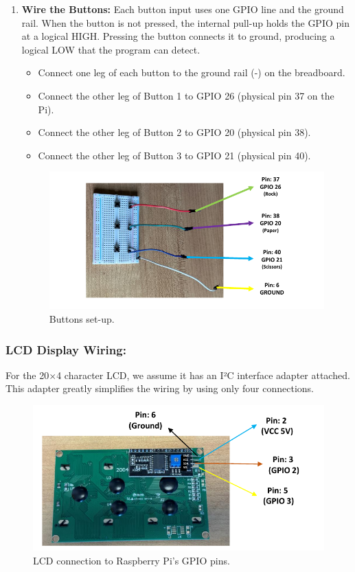 \documentclass[a4paper,11pt]{article}
\begin{document}
\begin{enumerate}
    \item \textbf{Wire the Buttons:} Each button input uses one GPIO line and the ground rail. 
    When the button is not pressed, the internal pull-up holds the GPIO pin at a logical HIGH. 
    Pressing the button connects it to ground, producing a logical LOW that the program can detect.
    \begin{itemize}
        \item Connect one leg of each button to the ground rail (-) on the breadboard.
        \item Connect the other leg of Button 1 to GPIO 26 (physical pin 37 on the Pi).
        \item Connect the other leg of Button 2 to GPIO 20 (physical pin 38).
        \item Connect the other leg of Button 3 to GPIO 21 (physical pin 40).
    \end{itemize}
    \begin{figure}[h] %
        \centering
        \includegraphics[width=1\textwidth]{fig1.pdf} %
        \caption{Buttons set-up.}
        \label{fig:runtime}
    \end{figure}

\end{enumerate}


\subsubsection*{LCD Display Wiring:}
For the 20$\times$4 character LCD, we assume it has an I²C interface adapter attached. 
This adapter greatly simplifies the wiring by using only four connections.

\begin{figure}[h] %
    \centering
    \includegraphics[width=.85\textwidth]{fig5.pdf} %
    \caption{LCD connection to Raspberry Pi's GPIO pins.}
    \label{fig:LCD}
\end{figure}
\end{document}
